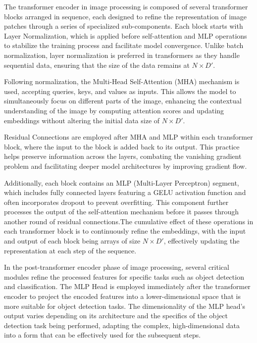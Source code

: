 The transformer encoder in image processing is composed of several transformer blocks arranged in sequence, each designed to refine the representation of image 
patches through a series of specialized sub-components. Each block starts with Layer Normalization, which is applied before self-attention and MLP operations 
to stabilize the training process and facilitate model convergence. Unlike batch normalization, layer normalization is preferred in transformers as they handle 
sequential data, ensuring that the size of the data remains at \(N \times D'\).

Following normalization, the Multi-Head Self-Attention (MHA) mechanism is used, accepting queries, keys, and values as inputs. This allows 
the model to simultaneously focus on different parts of the image, enhancing the contextual understanding of the image by computing attention scores and 
updating embeddings without altering the initial data size of \(N \times D'\).

Residual Connections are employed after MHA and MLP within each transformer block, where the input to the block is added back to its output. 
This practice helps preserve information across the layers, combating the vanishing gradient problem and facilitating deeper model architectures by 
improving gradient flow.

Additionally, each block contains an MLP (Multi-Layer Perceptron) segment, which includes fully connected layers featuring a GELU activation function 
and often incorporates dropout to prevent overfitting. This component further processes the output of the self-attention mechanism before it passes 
through another round of residual connections.The cumulative effect of these operations in each transformer block is to continuously refine the embeddings, 
with the input and output of each block being arrays of size \(N \times D'\), effectively updating the representation at each step of the sequence.


In the post-transformer encoder phase of image processing, several critical modules refine the processed features for specific tasks such as object detection 
and classification. The MLP Head is employed immediately after the transformer encoder to project the encoded features into a lower-dimensional space that 
is more suitable for object detection tasks. The dimensionality of the MLP head's output varies depending on its architecture and the specifics of the object 
detection task being performed, adapting the complex, high-dimensional data into a form that can be effectively used for the subsequent steps.



